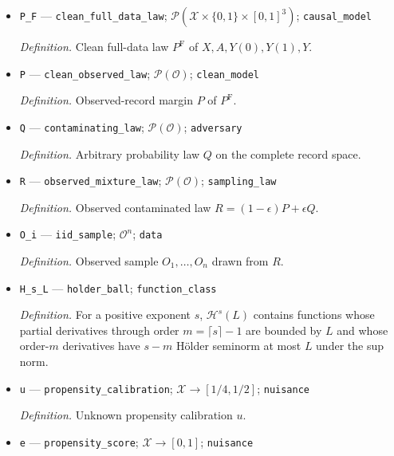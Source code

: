 \documentclass{article}
\begin{document}
\begin{itemize}
  \par\smallskip\noindent\emph{Definition.} Clean observed record \(O=(X,A,Y)\).
  \item \texttt{P\_\allowbreak{}F} --- \texttt{clean\_\allowbreak{}full\_\allowbreak{}data\_\allowbreak{}law}; \(\mathcal P(\mathcal X\times\{0,1\}\times[0,1]^3)\); \texttt{causal\_\allowbreak{}model}
  \par\smallskip\noindent\emph{Definition.} Clean full-data law \(P^{\mathrm F}\) of \(X,A,Y(0),Y(1),Y\).
  \item \texttt{P} --- \texttt{clean\_\allowbreak{}observed\_\allowbreak{}law}; \(\mathcal P(\mathcal O)\); \texttt{clean\_\allowbreak{}model}
  \par\smallskip\noindent\emph{Definition.} Observed-record margin \(P\) of \(P^{\mathrm F}\).
  \item \texttt{Q} --- \texttt{contaminating\_\allowbreak{}law}; \(\mathcal P(\mathcal O)\); \texttt{adversary}
  \par\smallskip\noindent\emph{Definition.} Arbitrary probability law \(Q\) on the complete record space.
  \item \texttt{R} --- \texttt{observed\_\allowbreak{}mixture\_\allowbreak{}law}; \(\mathcal P(\mathcal O)\); \texttt{sampling\_\allowbreak{}law}
  \par\smallskip\noindent\emph{Definition.} Observed contaminated law \(R=(1-\epsilon)P+\epsilon Q\).
  \item \texttt{O\_\allowbreak{}i} --- \texttt{iid\_\allowbreak{}sample}; \(\mathcal O^n\); \texttt{data}
  \par\smallskip\noindent\emph{Definition.} Observed sample \(O_1,\ldots,O_n\) drawn from \(R\).
  \item \texttt{H\_\allowbreak{}s\_\allowbreak{}L} --- \texttt{holder\_\allowbreak{}ball}; \texttt{function\_\allowbreak{}class}
  \par\smallskip\noindent\emph{Definition.} For a positive exponent \(s\), \(\mathcal H^s(L)\) contains functions whose partial derivatives through order \(m=\lceil s\rceil-1\) are bounded by \(L\) and whose order-\(m\) derivatives have \(s-m\) Hölder seminorm at most \(L\) under the sup norm.
  \item \texttt{u} --- \texttt{propensity\_\allowbreak{}calibration}; \(\mathcal X\to[1/4,1/2]\); \texttt{nuisance}
  \par\smallskip\noindent\emph{Definition.} Unknown propensity calibration \(u\).
  \item \texttt{e} --- \texttt{propensity\_\allowbreak{}score}; \(\mathcal X\to[0,1]\); \texttt{nuisance}

\end{itemize}
\end{document}
